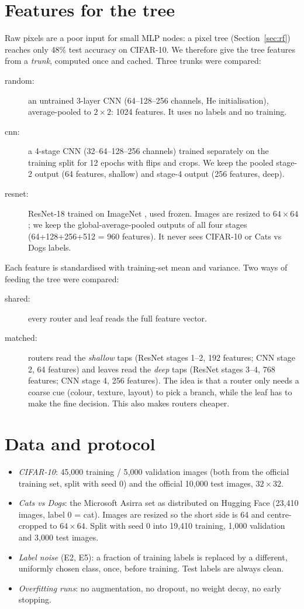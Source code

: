 \section{Features for the tree}
\label{sec:features}
Raw pixels are a poor input for small MLP nodes: a pixel tree (Section~\ref{sec:rf}) reaches only 48\% test accuracy on CIFAR-10. We therefore give the tree features from a \emph{trunk}, computed once and cached. Three trunks were compared:
\begin{description}
\item[random:] an untrained 3-layer CNN (64--128--256 channels, He initialisation), average-pooled to $2\times2$: 1024 features. It uses no labels and no training.
\item[cnn:] a 4-stage CNN (32--64--128--256 channels) trained separately on the training split for 12 epochs with flips and crops. We keep the pooled stage-2 output (64 features, shallow) and stage-4 output (256 features, deep).
\item[resnet:] ResNet-18 trained on ImageNet \cite{he2016}, used frozen. Images are resized to $64\times64$; we keep the global-average-pooled outputs of all four stages (64+128+256+512 = 960 features). It never sees CIFAR-10 or Cats vs Dogs labels.
\end{description}
Each feature is standardised with training-set mean and variance. Two ways of feeding the tree were compared:
\begin{description}
\item[shared:] every router and leaf reads the full feature vector.
\item[matched:] routers read the \emph{shallow} taps (ResNet stages 1--2, 192 features; CNN stage 2, 64 features) and leaves read the \emph{deep} taps (ResNet stages 3--4, 768 features; CNN stage 4, 256 features). The idea is that a router only needs a coarse cue (colour, texture, layout) to pick a branch, while the leaf has to make the fine decision. This also makes routers cheaper.
\end{description}

\section{Data and protocol}
\begin{itemize}
\item \emph{CIFAR-10}: 45{,}000 training / 5{,}000 validation images (both from the official training set, split with seed 0) and the official 10{,}000 test images, $32\times32$.
\item \emph{Cats vs Dogs}: the Microsoft Asirra set as distributed on Hugging Face (23{,}410 images, label 0 = cat). Images are resized so the short side is 64 and centre-cropped to $64\times64$. Split with seed 0 into 19{,}410 training, 1{,}000 validation and 3{,}000 test images.
\item \emph{Label noise} (E2, E5): a fraction of training labels is replaced by a different, uniformly chosen class, once, before training. Test labels are always clean.
\item \emph{Overfitting runs}: no augmentation, no dropout, no weight decay, no early stopping.
\end{itemize}
